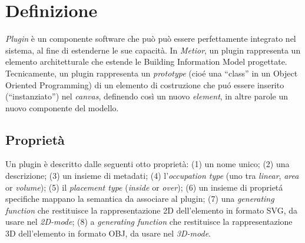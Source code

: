 \section{Definizione}
\label{sec:chapter_3_section_1}

\emph{Plugin} \`e un componente software che pu\`o può essere perfettamente integrato nel sistema, al fine di estenderne le sue capacit\`a.
In \emph{Metior}, un plugin rappresenta un elemento architetturale che estende le Building Information Model progettate.
Tecnicamente, un plugin rappresenta un \emph{prototype} (cio\'e una ``class'' in un Object Oriented Programming) di un elemento di
costruzione che pu\'o essere inserito (``instanziato'') nel \emph{canvas}, definendo cos\`i un nuovo \emph{element}, in altre parole
un nuovo componente del modello.


\subsection*{Proprietà}

\noindent
Un plugin \`e descritto dalle seguenti otto propriet\`a: (1) un nome unico; (2) una descrizione; (3) un insieme di metadati;
(4) l'\emph{occupation type} (uno tra \emph{linear}, \emph{area} or \emph{volume}); (5) il \emph{placement type} (\emph{inside} or \emph{over});
(6) un insieme di propriet\'a specifiche mappano la semantica da associare al plugin;
(7) una \emph{generating function} che restituisce la rappresentazione 2D dell'elemento in formato SVG, da usare nel \emph{2D-mode};
(8) a \emph{generating function} che restituisce la rappresentazione 3D dell'elemento in formato OBJ, da usare nel  \emph{3D-mode}.


